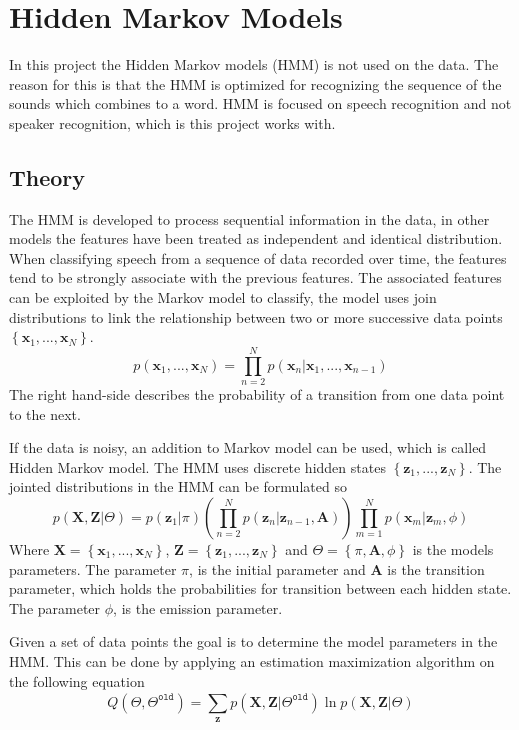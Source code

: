 \chapter{Hidden Markov Models}
In this project the Hidden Markov models (HMM) is not used on the data.
The reason for this is that the HMM is optimized for recognizing the sequence of the sounds which combines to a word.
HMM is focused on speech recognition and not speaker recognition, which is this project works with.

\section{Theory}   
The HMM is developed to process sequential information in the data, in other models the features have been treated as independent and identical distribution.
When classifying speech from a sequence of data recorded over time, the features tend to be strongly associate with the previous features.
The associated features can be exploited by the Markov model to classify, the model uses join distributions to link the relationship between two or more successive data points $ \left\lbrace \mathbf{x}_1,...,\mathbf{x}_N \right\rbrace  $.
\begin{equation}
p(\mathbf{x}_1,...,\mathbf{x}_N) = 
\prod_{n=2}^{N} 
p(\mathbf{x}_n | \mathbf{x}_1,...,\mathbf{x}_{n-1})
\label{eq:HMM_JD}
\end{equation} 
The right hand-side describes the probability of a transition from one data point to the next.

If the data is noisy, an addition to Markov model can be used, which is called Hidden Markov model.
The HMM uses discrete hidden states $ \left\lbrace \mathbf{z}_1,..., \mathbf{z}_N \right\rbrace  $.
The jointed distributions in the HMM can be formulated so
\begin{equation}
p(\mathbf{X},\mathbf{Z}|\Theta) = 
p(\mathbf{z}_1|\pi)
\left(\prod_{n=2}^{N} p(\mathbf{z}_n|\mathbf{z}_{n-1},\mathbf{A}) \right)
\prod_{m=1}^{N} p(\mathbf{x}_m|\mathbf{z}_m,\phi) 
\label{eq:HMM}
\end{equation}
Where $ \mathbf{X} = \left\lbrace \mathbf{x}_1,...,\mathbf{x}_N \right\rbrace  $, $ \mathbf{Z} = \left\lbrace \mathbf{z}_1,...,\mathbf{z}_N \right\rbrace  $ and $ \Theta = \left\lbrace \pi, \mathbf{A}, \phi \right\rbrace  $ is the models parameters. The parameter $ \pi $, is the initial parameter and \textbf{A} is the transition parameter, which holds the probabilities for transition between each hidden state.
The parameter $ \phi $, is the emission parameter. 

Given a set of data points the goal is to determine the model parameters in the HMM. This can be done by applying an estimation maximization algorithm on the following equation
\begin{equation}
Q(\Theta,\Theta^{\mathtt{old}})=
\sum_{\mathbf{z}}^{} p(\mathbf{X},\mathbf{Z}|\Theta^{\mathtt{old}})
\ln p(\mathbf{X},\mathbf{Z}|\Theta)
\end{equation}

             